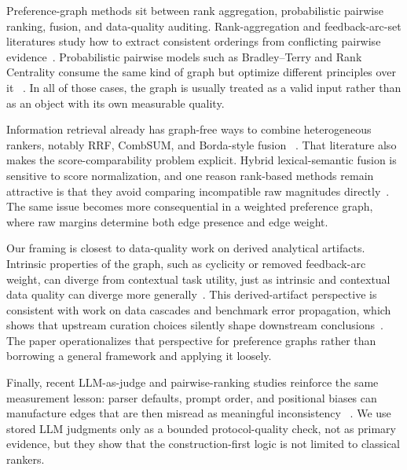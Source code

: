 \documentclass[acmsmall,anonymous,review]{acmart}
\begin{document}
Preference-graph methods sit between rank aggregation, probabilistic
pairwise ranking, fusion, and data-quality auditing. Rank-aggregation and
feedback-arc-set literatures study how to extract consistent orderings from
conflicting pairwise evidence~\cite{dwork2001rank,ailon2008aggregating,kemeny1959mathematics,kenyon2007fewerrors}.
Probabilistic pairwise models such as Bradley--Terry and Rank Centrality
consume the same kind of graph but optimize different principles over it
~\cite{bradley1952rank,negahban2017rankcentrality}. In all of those cases,
the graph is usually treated as a valid input rather than as an object with
its own measurable quality.

Information retrieval already has graph-free ways to combine heterogeneous
rankers, notably RRF, CombSUM, and Borda-style fusion
~\cite{cormack2009rrf,fox1994combination,lee1997analyses}. That literature
also makes the score-comparability problem explicit. Hybrid lexical-semantic
fusion is sensitive to score normalization, and one reason rank-based
methods remain attractive is that they avoid comparing incompatible raw
magnitudes directly~\cite{manmatha2002formal,bruch2023analysis}. The same
issue becomes more consequential in a weighted preference graph, where raw
margins determine both edge presence and edge weight.

Our framing is closest to data-quality work on derived analytical artifacts.
Intrinsic properties of the graph, such as cyclicity or removed feedback-arc
weight, can diverge from contextual task utility, just as intrinsic and
contextual data quality can diverge more generally~\cite{wang1996beyond}.
This derived-artifact perspective is consistent with work on data cascades
and benchmark error propagation, which shows that upstream curation choices
silently shape downstream conclusions~\cite{sambasivan2021datacascades,northcutt2021labelerrors}.
The paper operationalizes that perspective for preference graphs rather than
borrowing a general framework and applying it loosely.

Finally, recent LLM-as-judge and pairwise-ranking studies reinforce the same
measurement lesson: parser defaults, prompt order, and positional biases can
manufacture edges that are then misread as meaningful inconsistency
~\cite{sun-etal-2023-chatgpt,qin-etal-2024-large,zheng2023judging,shi2025judging,zeng2024llmrankfusion}.
We use stored LLM judgments only as a bounded protocol-quality check, not as
primary evidence, but they show that the construction-first logic is not
limited to classical rankers.
\end{document}
